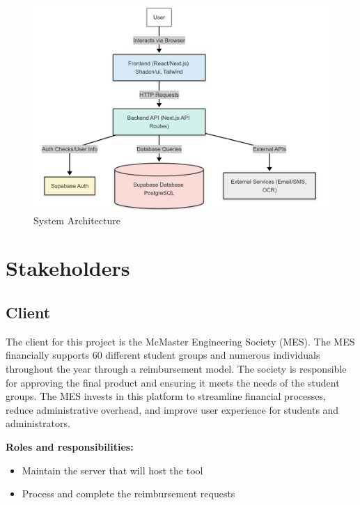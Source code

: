 \documentclass[12pt]{article}
\begin{document}
\clearpage

\begin{figure}[h!]
  \centering
  \includegraphics[width=1\textwidth]{stack.png}
  \caption{System Architecture}
  \label{fig:stack-architecture}
\end{figure}

\section{Stakeholders}
\subsection{Client}
The client for this project is the McMaster Engineering Society (MES). The MES financially supports 60 different student groups and numerous individuals throughout the year through a reimbursement model. The society is responsible for approving the final product and ensuring it meets the needs of the student groups.
The MES invests in this platform to streamline financial processes, reduce administrative overhead, and improve user experience for students and administrators.

\textbf{Roles and responsibilities:} 
\begin{itemize}
    \item Maintain the server that will host the tool
    \item Process and complete the reimbursement requests
\end{itemize}
\end{document}
